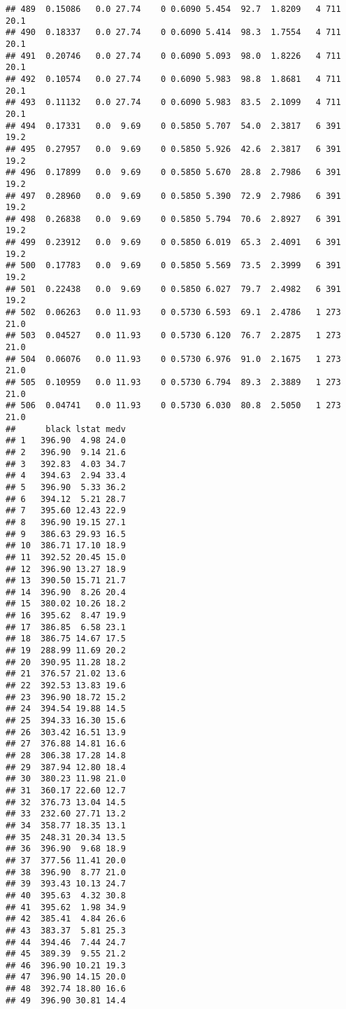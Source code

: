 \documentclass[]{article}
\begin{document}
\begin{verbatim}
## 489  0.15086   0.0 27.74    0 0.6090 5.454  92.7  1.8209   4 711    20.1
## 490  0.18337   0.0 27.74    0 0.6090 5.414  98.3  1.7554   4 711    20.1
## 491  0.20746   0.0 27.74    0 0.6090 5.093  98.0  1.8226   4 711    20.1
## 492  0.10574   0.0 27.74    0 0.6090 5.983  98.8  1.8681   4 711    20.1
## 493  0.11132   0.0 27.74    0 0.6090 5.983  83.5  2.1099   4 711    20.1
## 494  0.17331   0.0  9.69    0 0.5850 5.707  54.0  2.3817   6 391    19.2
## 495  0.27957   0.0  9.69    0 0.5850 5.926  42.6  2.3817   6 391    19.2
## 496  0.17899   0.0  9.69    0 0.5850 5.670  28.8  2.7986   6 391    19.2
## 497  0.28960   0.0  9.69    0 0.5850 5.390  72.9  2.7986   6 391    19.2
## 498  0.26838   0.0  9.69    0 0.5850 5.794  70.6  2.8927   6 391    19.2
## 499  0.23912   0.0  9.69    0 0.5850 6.019  65.3  2.4091   6 391    19.2
## 500  0.17783   0.0  9.69    0 0.5850 5.569  73.5  2.3999   6 391    19.2
## 501  0.22438   0.0  9.69    0 0.5850 6.027  79.7  2.4982   6 391    19.2
## 502  0.06263   0.0 11.93    0 0.5730 6.593  69.1  2.4786   1 273    21.0
## 503  0.04527   0.0 11.93    0 0.5730 6.120  76.7  2.2875   1 273    21.0
## 504  0.06076   0.0 11.93    0 0.5730 6.976  91.0  2.1675   1 273    21.0
## 505  0.10959   0.0 11.93    0 0.5730 6.794  89.3  2.3889   1 273    21.0
## 506  0.04741   0.0 11.93    0 0.5730 6.030  80.8  2.5050   1 273    21.0
##      black lstat medv
## 1   396.90  4.98 24.0
## 2   396.90  9.14 21.6
## 3   392.83  4.03 34.7
## 4   394.63  2.94 33.4
## 5   396.90  5.33 36.2
## 6   394.12  5.21 28.7
## 7   395.60 12.43 22.9
## 8   396.90 19.15 27.1
## 9   386.63 29.93 16.5
## 10  386.71 17.10 18.9
## 11  392.52 20.45 15.0
## 12  396.90 13.27 18.9
## 13  390.50 15.71 21.7
## 14  396.90  8.26 20.4
## 15  380.02 10.26 18.2
## 16  395.62  8.47 19.9
## 17  386.85  6.58 23.1
## 18  386.75 14.67 17.5
## 19  288.99 11.69 20.2
## 20  390.95 11.28 18.2
## 21  376.57 21.02 13.6
## 22  392.53 13.83 19.6
## 23  396.90 18.72 15.2
## 24  394.54 19.88 14.5
## 25  394.33 16.30 15.6
## 26  303.42 16.51 13.9
## 27  376.88 14.81 16.6
## 28  306.38 17.28 14.8
## 29  387.94 12.80 18.4
## 30  380.23 11.98 21.0
## 31  360.17 22.60 12.7
## 32  376.73 13.04 14.5
## 33  232.60 27.71 13.2
## 34  358.77 18.35 13.1
## 35  248.31 20.34 13.5
## 36  396.90  9.68 18.9
## 37  377.56 11.41 20.0
## 38  396.90  8.77 21.0
## 39  393.43 10.13 24.7
## 40  395.63  4.32 30.8
## 41  395.62  1.98 34.9
## 42  385.41  4.84 26.6
## 43  383.37  5.81 25.3
## 44  394.46  7.44 24.7
## 45  389.39  9.55 21.2
## 46  396.90 10.21 19.3
## 47  396.90 14.15 20.0
## 48  392.74 18.80 16.6
## 49  396.90 30.81 14.4

\end{verbatim}
\end{document}
